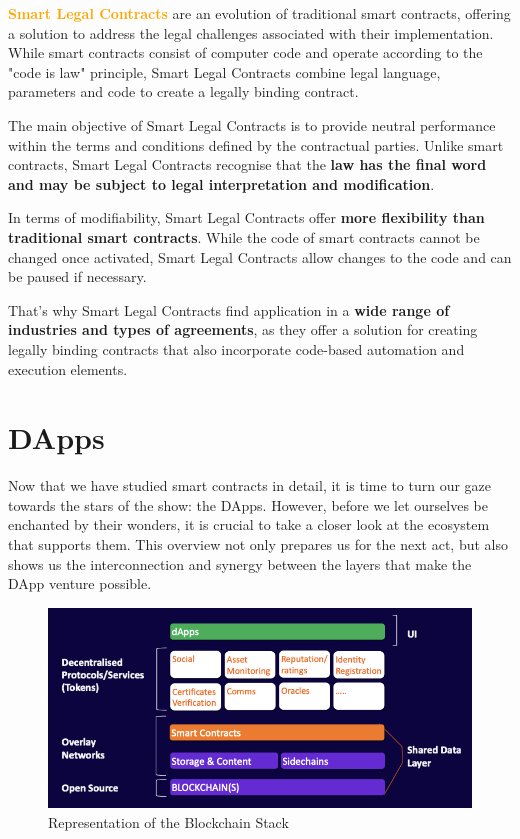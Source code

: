 \textbf{\textcolor{Orange}{Smart Legal Contracts}} are an evolution of traditional smart contracts, offering a solution to address the legal challenges associated with their implementation. While smart contracts consist of computer code and operate according to the "code is law" principle, Smart Legal Contracts combine legal language, parameters and code to create a legally binding contract.

The main objective of Smart Legal Contracts is to provide neutral performance within the terms and conditions defined by the contractual parties. Unlike smart contracts, Smart Legal Contracts recognise that the \textbf{law has the final word and may be subject to legal interpretation and modification}.

In terms of modifiability, Smart Legal Contracts offer \textbf{more flexibility than traditional smart contracts}. While the code of smart contracts cannot be changed once activated, Smart Legal Contracts allow changes to the code and can be paused if necessary.

That's why Smart Legal Contracts find application in a \textbf{wide range of industries and types of agreements}, as they offer a solution for creating legally binding contracts that also incorporate code-based automation and execution elements.

\section{DApps}

Now that we have studied smart contracts in detail, it is time to turn our gaze towards the stars of the show: the DApps. However, before we let ourselves be enchanted by their wonders, it is crucial to take a closer look at the ecosystem that supports them. This overview not only prepares us for the next act, but also shows us the interconnection and synergy between the layers that make the DApp venture possible. 

\begin{figure}[!htbp]
\centering\includegraphics[scale=0.75]{tikz/chapter 4 - Blockchain Stack.png}
\caption{Representation of the Blockchain Stack}
\end{figure}

